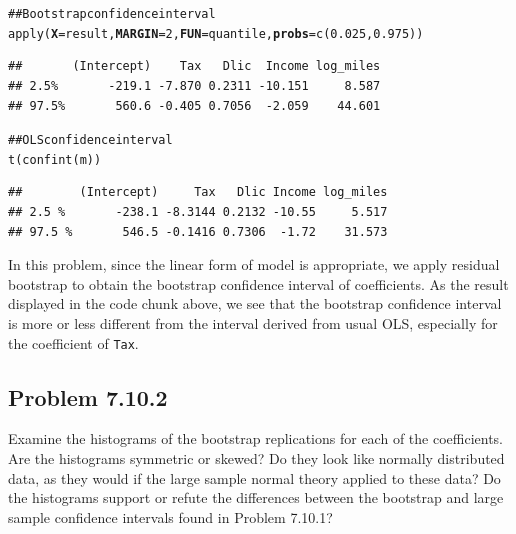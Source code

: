 \documentclass[12pt,oneside,a4paper]{article}\usepackage[]{graphicx}\usepackage[]{xcolor}
\makeatletter
\newcommand{\hlnum}[1]{\textcolor[rgb]{0,0,0}{#1}}%
\newcommand{\hlcom}[1]{\textcolor[rgb]{0.443,0.478,0.702}{#1}}%
\newcommand{\hlstd}[1]{\textcolor[rgb]{0,0,0}{#1}}%
\newcommand{\hlkwc}[1]{\textcolor[rgb]{0.498,0,0.333}{\textbf{#1}}}%
\newcommand{\hlkwd}[1]{\textcolor[rgb]{0,0,0}{#1}}%
\newenvironment{kframe}{%
 \def\at@end@of@kframe{}%
 \ifinner\ifhmode%
  \def\at@end@of@kframe{\end{minipage}}%
  \begin{minipage}{\columnwidth}%
 \fi\fi%
 \def\FrameCommand##1{\hskip\@totalleftmargin \hskip-\fboxsep
 \colorbox{shadecolor}{##1}\hskip-\fboxsep
     \hskip-\linewidth \hskip-\@totalleftmargin \hskip\columnwidth}%
 \MakeFramed {\advance\hsize-\width
   \@totalleftmargin\z@ \linewidth\hsize
   \@setminipage}}%
 {\par\unskip\endMakeFramed%
 \at@end@of@kframe}
\newenvironment{knitrout}{}{} %
\newcommand{\subproblem}[1]
{
    \subsection*{Problem {#1}}
}
\newcommand{\m}[1]{\texttt{{#1}}}
\makeatother
\begin{document}
\begin{knitrout}
\begin{kframe}
\begin{alltt}
\hlcom{## Bootstrap confidence interval}
\hlkwd{apply}\hlstd{(}\hlkwc{X} \hlstd{= result,} \hlkwc{MARGIN} \hlstd{=} \hlnum{2}\hlstd{,} \hlkwc{FUN} \hlstd{= quantile,} \hlkwc{probs} \hlstd{=} \hlkwd{c}\hlstd{(}\hlnum{0.025}\hlstd{,} \hlnum{0.975}\hlstd{))}
\end{alltt}
\begin{verbatim}
##       (Intercept)    Tax   Dlic  Income log_miles
## 2.5%       -219.1 -7.870 0.2311 -10.151     8.587
## 97.5%       560.6 -0.405 0.7056  -2.059    44.601
\end{verbatim}
\begin{alltt}
\hlcom{## OLS confidence interval}
\hlkwd{t}\hlstd{(}\hlkwd{confint}\hlstd{(m))}
\end{alltt}
\begin{verbatim}
##        (Intercept)     Tax   Dlic Income log_miles
## 2.5 %       -238.1 -8.3144 0.2132 -10.55     5.517
## 97.5 %       546.5 -0.1416 0.7306  -1.72    31.573
\end{verbatim}
\end{kframe}
\end{knitrout}

In this problem, since the linear form of model is appropriate, we apply residual bootstrap to obtain the bootstrap confidence interval of coefficients. As the result displayed in the code chunk above, we see that the bootstrap confidence interval is more or less different from the interval derived from usual OLS, especially for the coefficient of \m{Tax}.

\subproblem{7.10.2}
Examine the histograms of the bootstrap replications for each of the coefficients. Are the histograms symmetric or skewed? Do they look like normally distributed data, as they would if the large sample normal theory applied to these data? Do the histograms support or refute the differences between the bootstrap and large sample confidence intervals found in Problem 7.10.1?
\end{document}
